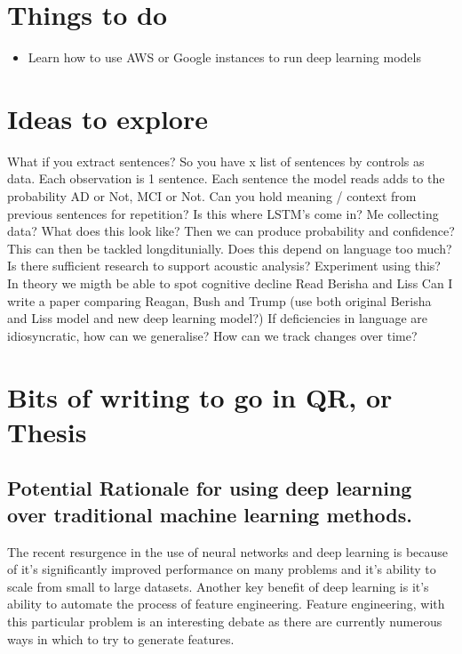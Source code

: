 \documentclass[a4paper]{book}
\begin{document}
\section {Things to do}
\begin {itemize}
    \item Learn how to use AWS or Google instances to run deep learning models
\end {itemize}
\section {Ideas to explore}
What if you extract sentences? So you have x list of sentences by controls as data. Each observation is 1 sentence. Each sentence the model reads adds to the probability AD or Not, MCI or Not. \newline
Can you hold meaning / context from previous sentences for repetition? Is this where LSTM's come in? \newline
Me collecting data? What does this look like? Then we can produce probability and confidence? This can then be tackled longditunially. \newline
Does this depend on language too much? Is there sufficient research to support acoustic analysis?
Experiment using this? In theory we migth be able to spot cognitive decline \newline
Read Berisha and Liss \newline
Can I write a paper comparing Reagan, Bush and Trump (use both original Berisha and Liss model and new deep learning model?)
If deficiencies in language are idiosyncratic, how can we generalise? How can we track changes over time?


\section {Bits of writing to go in QR, or Thesis}
\subsection {Potential Rationale for using deep learning over traditional machine learning methods.}
The recent resurgence in the use of neural networks and deep learning is because of it's significantly improved performance on many problems and it's ability to scale from small to large datasets. Another key benefit of deep learning is it's ability to automate the process of feature engineering. Feature engineering, with this particular problem is an interesting debate as there are currently numerous ways in which to try to generate features.
\end{document}
